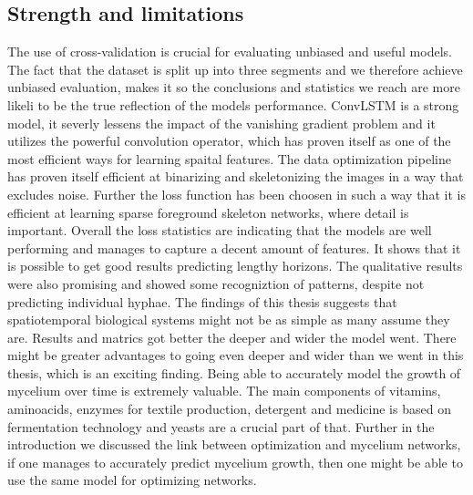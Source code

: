 \documentclass[a4paper,12pt]{article}
\begin{document}
\subsection{Strength and limitations}
The use of cross-validation is crucial for evaluating unbiased and useful models. The fact that the dataset is split up into three segments and we therefore achieve unbiased evaluation, makes it so the conclusions and statistics we reach are more likeli to be the true reflection of the models performance.
ConvLSTM is a strong model, it severly lessens the impact of the vanishing gradient problem and it utilizes the powerful convolution operator, which has proven itself as one of the most efficient ways for learning spaital features. The data optimization pipeline has proven itself efficient at binarizing and skeletonizing the images in a way that excludes noise. Further the loss function has been choosen in such a way that it is efficient at learning sparse foreground skeleton networks, where detail is important. 
Overall the loss statistics are indicating that the models are well performing and manages to capture a decent amount of features. It shows that it is possible to get good results predicting lengthy horizons. The qualitative results were also promising and showed some recogniztion of patterns, despite not predicting individual hyphae.
The findings of this thesis suggests that spatiotemporal biological systems might not be as simple as many assume they are. Results and matrics got better the deeper and wider the model went. There might be greater advantages to going even deeper and wider than we went in this thesis, which is an exciting finding.
Being able to accurately model the growth of mycelium over time is extremely valuable. The main components of vitamins, aminoacids, enzymes for textile production, detergent and medicine is based on fermentation technology and yeasts are a crucial part of that. Further in the introduction we discussed the link between optimization and mycelium networks, if one manages to accurately predict mycelium growth, then one might be able to use the same model for optimizing networks.
\end{document}
